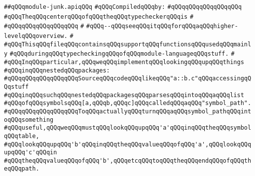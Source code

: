 \label{src/lib/compiler/front/typer-stuff/modules/module-junk.api}
\verb|##qQQqmodule-junk.apiqQQq|\newline
\newline
\verb|#qQQqCompiledqQQqby:|\newline
\verb|#qQQqqQQqqQQqqQQqqQQq|\newline
\newline
\newline
\newline
\verb|#qQQqTheqQQqcenterqQQqofqQQqtheqQQqtypecheckerqQQqis|\newline
\verb|#|\newline
\verb|#qQQqqQQqqQQqqQQqqQQq|\newline
\verb|#|\newline
\verb|#qQQq--qQQqseeqQQqitqQQqforqQQqaqQQqhigher-levelqQQqoverview.|\newline
\verb|#|\newline
\verb|#qQQqThisqQQqfileqQQqcontainsqQQqsupportqQQqfunctionsqQQqusedqQQqmainly|\newline
\verb|#qQQqduringqQQqtypecheckingqQQqofqQQqmodule-languageqQQqstuff.|\newline
\verb|#|\newline
\verb|#qQQqInqQQqparticular,qQQqweqQQqimplementqQQqlookingqQQqupqQQqthings|\newline
\verb|#qQQqinqQQqnestedqQQqpackages:|\newline
\verb|#qQQqqQQqqQQqqQQqqQQqSourceqQQqcodeqQQqlikeqQQq"a::b.c"qQQqaccessingqQQqstuff|\newline
\verb|#qQQqinqQQqsuchqQQqnestedqQQqpackagesqQQqparsesqQQqintoqQQqaqQQqlist|\newline
\verb|#qQQqofqQQqsymbolsqQQq[a,qQQqb,qQQqc]qQQqcalledqQQqaqQQq"symbol_path".|\newline
\verb|#qQQqqQQqqQQqqQQqqQQqToqQQqactuallyqQQqturnqQQqaqQQqsymbol_pathqQQqintoqQQqsomething|\newline
\verb|#qQQquseful,qQQqweqQQqmustqQQqlookqQQqupqQQq'a'qQQqinqQQqtheqQQqsymbolqQQqtable,|\newline
\verb|#qQQqlookqQQqupqQQq'b'qQQqinqQQqtheqQQqvalueqQQqofqQQq'a',qQQqlookqQQqupqQQq'c'qQQqin|\newline
\verb|#qQQqtheqQQqvalueqQQqofqQQq'b',qQQqetcqQQqtoqQQqtheqQQqendqQQqofqQQqtheqQQqpath.|\newline
